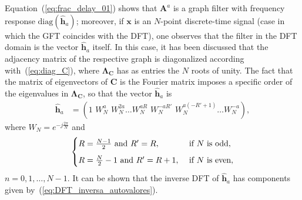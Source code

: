 Equation~(\ref{eq:frac_delay_01}) shows that $ \mathbf{A}^a $ is a graph filter with frequency response $ \text{diag}(\widehat{\mathbf{h}}_a) $; moreover, if $ \mathbf{x} $ is an $N$-point discrete-time signal (case in which the GFT coincides with the DFT), one observes that the filter in the DFT domain is the vector $ \widehat{\mathbf{h}}_a $ itself. In this case, it has been discussed that the adjacency matrix of the respective graph is diagonalized according with~(\ref{eq:diag_C}), where $ \mathbf{\Lambda}_{\mathbf{C}} $ has as entries the $ N $ roots of unity. The fact that the matrix of eigenvectors of $ \mathbf{C} $ is the Fourier matrix imposes a specific order of the eigenvalues in $ \mathbf{\Lambda}_{\mathbf{C}} $, so that the vector $ \widehat{\mathbf{h}}_a$ is
\begin{align*}
\widehat{\mathbf{h}}_a &= (1 \,\, W_N^a \,\,W_N^{2a}\ldots W_N^{aR} \,\,W_N^{-aR'} \,\,W_N^{a(-R' + 1)}\ldots W_N^{-a}),
\end{align*}
where $ W_N = e^{-j \frac{2\pi}{N}} $ and
\begin{equation}
\begin{cases}
R = \frac{N-1}{2} \text{ and } R' = R, & \text{ if } N \text{ is odd},\vspace{0.2cm} \\
R = \frac{N}{2} - 1 \text{ and } R' = R+1, & \text{ if } N \text{ is even},
\end{cases}
\end{equation}
$n=0,1,\ldots,N-1$. It can be shown that the inverse DFT of $ \widehat{\mathbf{h}}_a $ has components given by~(\ref{eq:DFT_inversa_autovalores}).

